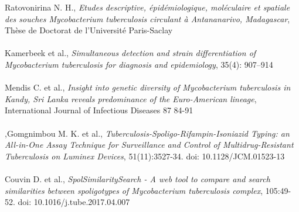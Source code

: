 \documentclass[twoside,a4paper,11pt,frenchb,openany]{report}
\begin{document}
\begin{spacing}{0.5}
\begin{thebibliography}{10}
Ratovonirina N. H., \textit{Etudes descriptive, épidémiologique, moléculaire et spatiale des souches Mycobacterium tuberculosis circulant à Antananarivo, Madagascar}, Thèse de Doctorat de l'Université Paris-Saclay\\ \\

Kamerbeek et al., \textit{Simultaneous detection and strain differentiation of Mycobacterium tuberculosis for diagnosis and epidemiology}, 35(4): 907–914\\ \\

Mendis C. et al., \textit{Insight into genetic diversity of Mycobacterium tuberculosis in Kandy, Sri Lanka reveals predominance of the Euro-American lineage}, International Journal of Infectious Diseases 87 84-91\\ \\

,Gomgnimbou M. K. et al., \textit{Tuberculosis-Spoligo-Rifampin-Isoniazid Typing: an All-in-One Assay Technique for Surveillance and Control of Multidrug-Resistant Tuberculosis on Luminex Devices}, 51(11):3527-34. doi: 10.1128/JCM.01523-13\\ \\

Couvin D. et al., \textit{SpolSimilaritySearch - A web tool to compare and search similarities between spoligotypes of Mycobacterium tuberculosis complex}, 105:49-52. doi: 10.1016/j.tube.2017.04.007


\end{thebibliography}
\end{spacing}
\end{document}
